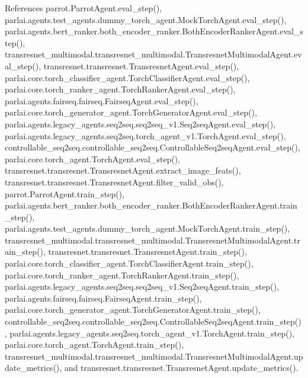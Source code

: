 References parrot.\+Parrot\+Agent.\+eval\+\_\+step(), parlai.\+agents.\+test\+\_\+agents.\+dummy\+\_\+torch\+\_\+agent.\+Mock\+Torch\+Agent.\+eval\+\_\+step(), parlai.\+agents.\+bert\+\_\+ranker.\+both\+\_\+encoder\+\_\+ranker.\+Both\+Encoder\+Ranker\+Agent.\+eval\+\_\+step(), transresnet\+\_\+multimodal.\+transresnet\+\_\+multimodal.\+Transresnet\+Multimodal\+Agent.\+eval\+\_\+step(), transresnet.\+transresnet.\+Transresnet\+Agent.\+eval\+\_\+step(), parlai.\+core.\+torch\+\_\+classifier\+\_\+agent.\+Torch\+Classifier\+Agent.\+eval\+\_\+step(), parlai.\+core.\+torch\+\_\+ranker\+\_\+agent.\+Torch\+Ranker\+Agent.\+eval\+\_\+step(), parlai.\+agents.\+fairseq.\+fairseq.\+Fairseq\+Agent.\+eval\+\_\+step(), parlai.\+core.\+torch\+\_\+generator\+\_\+agent.\+Torch\+Generator\+Agent.\+eval\+\_\+step(), parlai.\+agents.\+legacy\+\_\+agents.\+seq2seq.\+seq2seq\+\_\+v1.\+Seq2seq\+Agent.\+eval\+\_\+step(), parlai.\+agents.\+legacy\+\_\+agents.\+seq2seq.\+torch\+\_\+agent\+\_\+v1.\+Torch\+Agent.\+eval\+\_\+step(), controllable\+\_\+seq2seq.\+controllable\+\_\+seq2seq.\+Controllable\+Seq2seq\+Agent.\+eval\+\_\+step(), parlai.\+core.\+torch\+\_\+agent.\+Torch\+Agent.\+eval\+\_\+step(), transresnet.\+transresnet.\+Transresnet\+Agent.\+extract\+\_\+image\+\_\+feats(), transresnet.\+transresnet.\+Transresnet\+Agent.\+filter\+\_\+valid\+\_\+obs(), parrot.\+Parrot\+Agent.\+train\+\_\+step(), parlai.\+agents.\+bert\+\_\+ranker.\+both\+\_\+encoder\+\_\+ranker.\+Both\+Encoder\+Ranker\+Agent.\+train\+\_\+step(), parlai.\+agents.\+test\+\_\+agents.\+dummy\+\_\+torch\+\_\+agent.\+Mock\+Torch\+Agent.\+train\+\_\+step(), transresnet\+\_\+multimodal.\+transresnet\+\_\+multimodal.\+Transresnet\+Multimodal\+Agent.\+train\+\_\+step(), transresnet.\+transresnet.\+Transresnet\+Agent.\+train\+\_\+step(), parlai.\+core.\+torch\+\_\+classifier\+\_\+agent.\+Torch\+Classifier\+Agent.\+train\+\_\+step(), parlai.\+core.\+torch\+\_\+ranker\+\_\+agent.\+Torch\+Ranker\+Agent.\+train\+\_\+step(), parlai.\+agents.\+legacy\+\_\+agents.\+seq2seq.\+seq2seq\+\_\+v1.\+Seq2seq\+Agent.\+train\+\_\+step(), parlai.\+agents.\+fairseq.\+fairseq.\+Fairseq\+Agent.\+train\+\_\+step(), parlai.\+core.\+torch\+\_\+generator\+\_\+agent.\+Torch\+Generator\+Agent.\+train\+\_\+step(), controllable\+\_\+seq2seq.\+controllable\+\_\+seq2seq.\+Controllable\+Seq2seq\+Agent.\+train\+\_\+step(), parlai.\+agents.\+legacy\+\_\+agents.\+seq2seq.\+torch\+\_\+agent\+\_\+v1.\+Torch\+Agent.\+train\+\_\+step(), parlai.\+core.\+torch\+\_\+agent.\+Torch\+Agent.\+train\+\_\+step(), transresnet\+\_\+multimodal.\+transresnet\+\_\+multimodal.\+Transresnet\+Multimodal\+Agent.\+update\+\_\+metrics(), and transresnet.\+transresnet.\+Transresnet\+Agent.\+update\+\_\+metrics().



